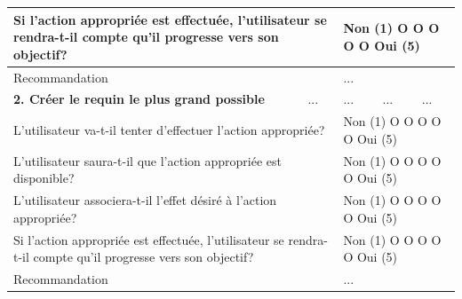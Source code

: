 \documentclass{article}
\begin{document}
\begin{table}[h]
\begin{tabular}{|p{6cm}|p{1.5cm}|p{1.5cm}|p{2.5cm}|p{3.5cm}|}
		\multicolumn{2}{|p{7.5cm}|}{Si l’action appropriée est effectuée, l’utilisateur se rendra-t-il compte qu’il progresse vers son objectif?} & \multicolumn{3}{p{7.5cm}|}{Non (1) O O O O O Oui (5)}                                                                                       \\ \hline
		\multicolumn{2}{|p{7.5cm}|}{Recommandation}                                                                                               & \multicolumn{3}{p{7.5cm}|}{...}                                                                                                             \\ \hline
		\textbf{2. Créer le requin le plus grand possible}                                                                                        & ...                                                   & ...              & ...                                      & ...                   \\ \hline
		\multicolumn{2}{|p{7.5cm}|}{L’utilisateur va-t-il tenter d’effectuer l’action appropriée?}                                                & \multicolumn{3}{p{7.5cm}|}{Non (1) O O O O O Oui (5)}                                                                                       \\ \hline
		\multicolumn{2}{|p{7.5cm}|}{L’utilisateur saura-t-il que l’action appropriée est disponible?}                                             & \multicolumn{3}{p{7.5cm}|}{Non (1) O O O O O Oui (5)}                                                                                       \\ \hline
		\multicolumn{2}{|p{7.5cm}|}{L’utilisateur associera-t-il l’effet désiré à l’action appropriée?}                                           & \multicolumn{3}{p{7.5cm}|}{Non (1) O O O O O Oui (5)}                                                                                       \\ \hline
		\multicolumn{2}{|p{7.5cm}|}{Si l’action appropriée est effectuée, l’utilisateur se rendra-t-il compte qu’il progresse vers son objectif?} & \multicolumn{3}{p{7.5cm}|}{Non (1) O O O O O Oui (5)}                                                                                       \\ \hline
		\multicolumn{2}{|p{7.5cm}|}{Recommandation}                                                                                               & \multicolumn{3}{p{7.5cm}|}{...}                                                                                                             \\ \hline

\end{tabular}
\end{table}
\end{document}
